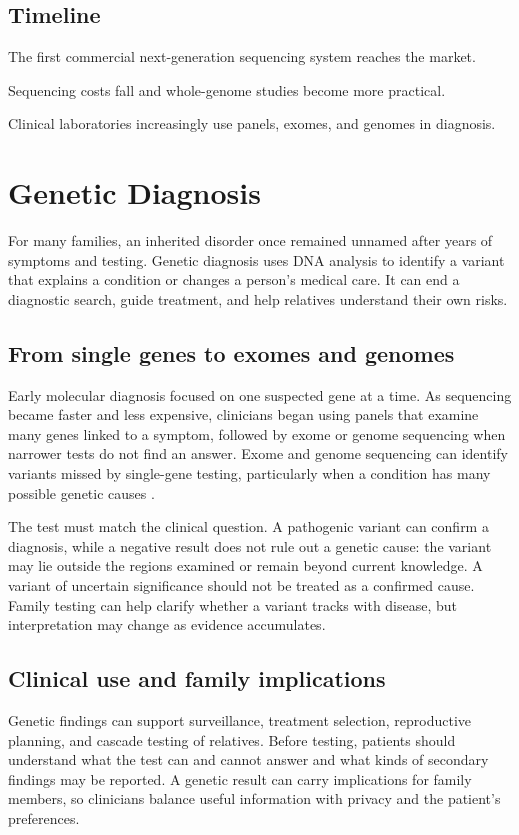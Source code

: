 \documentclass[12pt,oneside]{book}
\begin{document}
\section*{Timeline}
\begin{description}[leftmargin=2.3cm,style=nextline]
  \item[2005] The first commercial next-generation sequencing system reaches the market.
  \item[Late 2000s] Sequencing costs fall and whole-genome studies become more practical.
  \item[2010s] Clinical laboratories increasingly use panels, exomes, and genomes in diagnosis.
\end{description}
\chapter[Genetic Diagnosis]{Genetic Diagnosis}

For many families, an inherited disorder once remained unnamed after years of
symptoms and testing. Genetic diagnosis uses DNA analysis to identify a
variant that explains a condition or changes a person's medical care. It can
end a diagnostic search, guide treatment, and help relatives understand their
own risks.

\section{From single genes to exomes and genomes}
Early molecular diagnosis focused on one suspected gene at a time. As
sequencing became faster and less expensive, clinicians began using panels
that examine many genes linked to a symptom, followed by exome or genome
sequencing when narrower tests do not find an answer. Exome and genome
sequencing can identify variants missed by single-gene testing, particularly
when a condition has many possible genetic causes
\cite{nejmClinicalGenome,medlineGeneticSequencing}.

The test must match the clinical question. A pathogenic variant can confirm a
diagnosis, while a negative result does not rule out a genetic cause: the
variant may lie outside the regions examined or remain beyond current
knowledge. A variant of uncertain significance should not be treated as a
confirmed cause. Family testing can help clarify whether a variant tracks
with disease, but interpretation may change as evidence accumulates.

\section{Clinical use and family implications}
Genetic findings can support surveillance, treatment selection, reproductive
planning, and cascade testing of relatives. Before testing, patients should
understand what the test can and cannot answer and what kinds of secondary
findings may be reported. A genetic result can carry implications for family
members, so clinicians balance useful information with privacy and the
patient's preferences.
\end{document}
